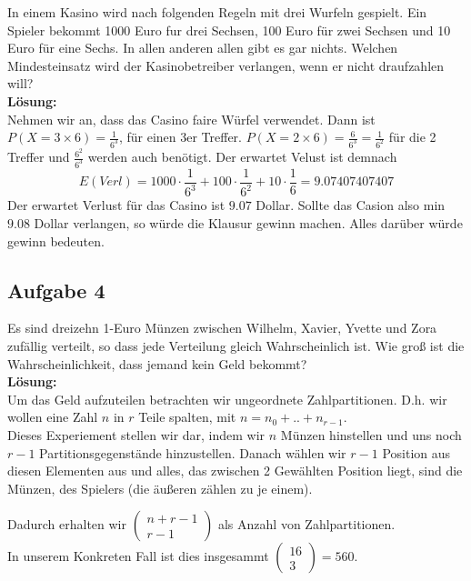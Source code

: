 \documentclass[11pt,a4paper,ngerman]{article}
\begin{document}
In einem Kasino wird nach folgenden Regeln mit drei Wurfeln gespielt. Ein Spieler
bekommt 1000 Euro fur drei Sechsen, 100 Euro für zwei Sechsen und 10 Euro für
eine Sechs. In allen anderen allen gibt es gar nichts. Welchen Mindesteinsatz wird
der Kasinobetreiber verlangen, wenn er nicht draufzahlen will?\\

\textbf{Lösung:}\\

Nehmen wir an, dass das Casino faire Würfel verwendet. Dann ist
$P( X = 3\times6) = \frac{1}{6^3}$, für einen 3er Treffer. $P( X = 2 \times 6) = \frac{6}{6^3} = \frac{1}{6^2}$ für
die 2 Treffer und $\frac{6^2}{6^3}$ werden auch benötigt. Der erwartet Velust ist demnach
\[
    E(Verl) = 1000 \cdot \frac{1}{6^3} + 100 \cdot \frac{1}{6^2} + 10 \cdot \frac{1}{6} = 9.07407407407
\]
Der erwartet Verlust für das Casino ist $9.07$ Dollar. Sollte das Casion also min $9.08$ Dollar verlangen, so
würde die Klausur gewinn machen. Alles darüber würde gewinn bedeuten.

\subsection*{Aufgabe 4}

Es sind dreizehn 1-Euro Münzen zwischen Wilhelm, Xavier, Yvette und Zora zufällig verteilt, so dass jede Verteilung gleich Wahrscheinlich ist.
Wie groß ist die Wahrscheinlichkeit, dass jemand kein Geld bekommt?\\

\textbf{Lösung:}\\

Um das Geld aufzuteilen betrachten wir ungeordnete Zahlpartitionen. D.h. wir wollen eine Zahl $n$ in $r$ Teile spalten, mit $n = n_0 + .. + n_{r-1}$.\\

Dieses Experiement stellen wir dar, indem wir $n$ Münzen hinstellen und uns noch $r-1$ Partitionsgegenstände hinzustellen. Danach wählen wir $r-1$ Position
aus diesen Elementen aus und alles, das zwischen 2 Gewählten Position liegt, sind die Münzen, des Spielers (die äußeren zählen zu je einem).

Dadurch erhalten wir $\left( \begin{array}{cc} n + r - 1 \\ r - 1\end{array}\right)$ als Anzahl von Zahlpartitionen.\\ In unserem Konkreten Fall ist dies
insgesammt $\begin{pmatrix} 16 \\ 3 \end{pmatrix} = 560$.\\
\end{document}
